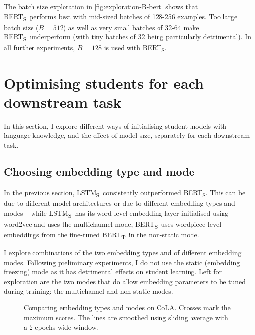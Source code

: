 \documentclass[bsc,frontabs,twoside,singlespacing,parskip,deptreport]{infthesis}
\def\BERTT{BERT\textsubscript{T}}
\def\BERTS{BERT\textsubscript{S}}
\def\LSTMS{LSTM\textsubscript{S}}
\def\sliding{The lines are smoothed using sliding average with a 2-epochs-wide window.}
\begin{document}
{{{      The batch size exploration in \autoref{fig:exploration-B-bert} shows that \BERTS~performs best with mid-sized batches of 128-256 examples. Too large batch size ($B=512$) as well as very small batches of 32-64 make \BERTS~underperform (with tiny batches of 32 being particularly detrimental).
      In all further experiments, $B=128$ is used with \BERTS.
    }
  }

  \section{Optimising students for each downstream task}{
    In this section, I explore different ways of initialising student models with language knowledge, and the effect of model size, separately for each downstream task.

    \subsection{Choosing embedding type and mode}{
      In the previous section, \LSTMS~consistently outperformed \BERTS. This can be due to different model architectures or due to different embedding types and modes -- while \LSTMS~has its word-level embedding layer initialised using word2vec and uses the multichannel mode, \BERTS~uses wordpiece-level embeddings from the fine-tuned \BERTT~in the non-static mode.

      I explore combinations of the two embedding types and of different embedding modes. Following preliminary experiments, I do not use the static (embedding freezing) mode as it has detrimental effects on student learning. Left for exploration are the two modes that do allow embedding parameters to be tuned during training: the multichannel and non-static modes.

      \begin{figure}[h!t]
        \centering
        \caption{Comparing embedding types and modes on CoLA. Crosses mark the maximum scores. \sliding}
        \label{fig:exploration-embed-cola}
      \end{figure}

}}}
\end{document}
